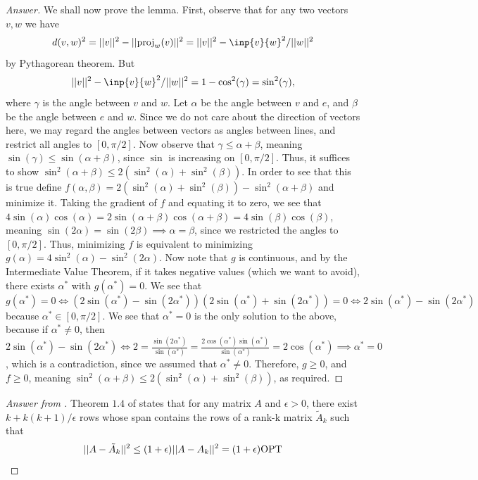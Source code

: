 \documentclass{article}
\begin{document}
\begin{proof}[Answer]
We shall now prove the lemma. First, observe that for any two vectors $v,w$ we have $$d(v,w)^2 = \norm{v}^2 - \norm{\proj_w(v)}^2 = \norm{v}^2 - \inp{v}{w}^2/\norm{w}^2$$ by Pythagorean theorem. But $$\norm{v}^2 - \inp{v}{w}^2/\norm{w}^2 = 1 - \cos^2(\gamma) = \sin^2(\gamma),$$ where $\gamma$ is the angle between $v$ and $w$. Let $\alpha$ be the angle between $v$ and $e$, and $\beta$ be the angle between $e$ and $w$. Since we do not care about the direction of vectors here, we may regard the angles between vectors as angles between lines, and restrict all angles to $[0,\pi/2]$. Now observe that $\gamma \leq \alpha + \beta$, meaning $\sin(\gamma)\leq \sin(\alpha+\beta)$, since $\sin$ is increasing on $[0,\pi/2]$. Thus, it suffices to show $\sin^2(\alpha+\beta) \leq 2(\sin^2(\alpha)+\sin^2(\beta))$. In order to see that this is true define $f(\alpha,\beta) = 2(\sin^2(\alpha)+\sin^2(\beta))-\sin^2(\alpha+\beta)$ and minimize it. Taking the gradient of $f$ and equating it to zero, we see that $4\sin(\alpha)\cos(\alpha)=2\sin(\alpha+\beta)\cos(\alpha+\beta) = 4\sin(\beta)\cos(\beta)$, meaning $\sin(2\alpha)=\sin(2\beta)\implies \alpha = \beta$, since we restricted the angles to $[0,\pi/2]$. Thus, minimizing $f$ is equivalent to minimizing $g(\alpha) = 4\sin^2(\alpha)-\sin^2(2\alpha)$. Now note that $g$ is continuous, and by the Intermediate Value Theorem, if it takes negative values (which we want to avoid), there exists $\alpha^*$ with $g(\alpha^*) = 0$. We see that $$g(\alpha^*)=0\iff (2\sin(\alpha^*)-\sin(2\alpha^*))(2\sin(\alpha^*)+\sin(2\alpha^*))=0 \iff 2\sin(\alpha^*)-\sin(2\alpha^*)$$ because $\alpha^*\in [0,\pi/2]$. We see that $\alpha^*=0$ is the only solution to the above, because if $\alpha^*\neq 0$, then $2\sin(\alpha^*)-\sin(2\alpha^*)\iff 2 = \frac{\sin(2\alpha^*)}{\sin(\alpha^*)} = \frac{2\cos(\alpha^*)\sin(\alpha^*)}{\sin(\alpha^*)} = 2\cos(\alpha^*)\implies \alpha^* = 0$, which is a contradiction, since we assumed that $\alpha^* \neq 0$. Therefore, $g\geq0$, and $f\geq 0$, meaning $\sin^2(\alpha+\beta)\leq 2(\sin^2(\alpha)+\sin^2(\beta))$, as required.
\end{proof}

\begin{proof}[Answer from \cite{deshpande2006matrix}]
Theorem $1.4$ of \cite{deshpande2006matrix} states that for any matrix $A$ and $\epsilon>0$, there exist $k+k(k +1)/\epsilon$ rows whose span contains the rows of
a rank-k matrix $\tilde{A}_k$ such that 
$$||A - \tilde{A}_k||^2 \leq (1+\epsilon)||A - A_k||^2 = (1+\epsilon)\text{OPT}$$
\end{proof}
\end{document}
